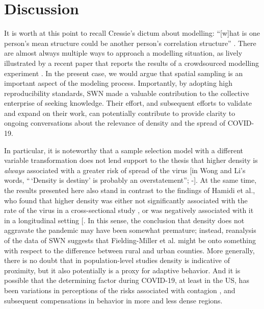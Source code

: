 \documentclass[preprint, 3p,
authoryear]{elsarticle} %
\begin{document}
\hypertarget{discussion}{%
\section{Discussion}\label{discussion}}

It is worth at this point to recall Cressie's dictum about modelling:
``{[}w{]}hat is one person's mean structure could be another person's
correlation structure'' \citep[p.~201]{Cressie1989geostatistics}. There
are almost always multiple ways to approach a modelling situation, as
lively illustrated by a recent paper that reports the results of a
crowdsourced modelling experiment \citep{Schweinsberg2021same}. In the
present case, we would argue that spatial sampling is an important
aspect of the modeling process. Importantly, by adopting high
reproducibility standards, SWN made a valuable contribution to the
collective enterprise of seeking knowledge. Their effort, and subsequent
efforts to validate and expand on their work, can potentially contribute
to provide clarity to ongoing conversations about the relevance of
density and the spread of COVID-19.

In particular, it is noteworthy that a sample selection model with a
different variable transformation does not lend support to the thesis
that higher density is \emph{always} associated with a greater risk of
spread of the virus {[}in Wong and Li's words, ``\,`Density is destiny'
is probably an overstatement''; -\citet{Wong2020spreading}{]}. At the
same time, the results presented here also stand in contrast to the
findings of Hamidi et al., who found that higher density was either not
significantly associated with the rate of the virus in a cross-sectional
study \citep{Hamidi2020density}, or was negatively associated with it in
a longitudinal setting {[}\citet{Hamidi2020longitudinal}. In this sense,
the conclusion that density does not aggravate the pandemic may have
been somewhat premature; instead, reanalysis of the data of SWN suggests
that Fielding-Miller et al. \citeyearpar{Fielding2020social} might be
onto something with respect to the difference between rural and urban
counties. More generally, there is no doubt that in population-level
studies density is indicative of proximity, but it also potentially is a
proxy for adaptive behavior. And it is possible that the determining
factor during COVID-19, at least in the US, has been variations in
perceptions of the risks associated with contagion
\citep{Chauhan2021covid}, and subsequent compensations in behavior in
more and less dense regions.
\end{document}
